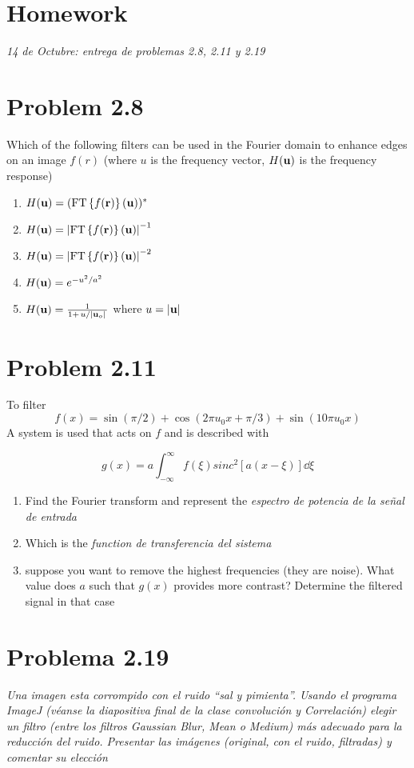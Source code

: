 \documentclass[../main/main.tex]{subfiles}
\begin{document}
\section{Homework}

\emph{14 de Octubre: entrega de problemas 2.8, 2.11 y 2.19}

\section*{Problem 2.8}


Which of the following filters can be used in the Fourier domain to enhance edges on an image $f(r)$ (where $u$ is the frequency vector, $H(\vb{u})$ is the frequency response)

\begin{enumerate}
	\item $H(\vb{u}) = (\textrm{FT}\left\{f(\vb{r})\right\}(\vb{u}))^{*}$
	\item $H(\vb{u}) = \abs{\textrm{FT}\left\{f(\vb{r})\right\}(\vb{u})}^{-1}$
	\item $H(\vb{u}) = \abs{\textrm{FT}\left\{f(\vb{r})\right\}(\vb{u})}^{-2}$
	\item $H(\vb{u}) = e^{-u^{2}/a^{2}}$
	\item $H(\u) = \frac{1}{1+\flatfrac {u}{|\u_{o}|}}$ where $u = \abs{\vb{u}}$
\end{enumerate}

\section*{Problem 2.11}

To filter
\begin{equation*}
	f(x) = \sin(\pi/2) + \cos(2\pi u_{0}x + \pi/3) + \sin(10\pi u_{0} x)
\end{equation*}
A system is used that acts on $f$ and is described with

\begin{equation*}
	g(x) = a \int_{-\infty}^{\infty} %
	f(\xi) sinc^{2}\left[a(x - \xi)\right]\dd{\xi}
\end{equation*}

\begin{enumerate}
	\item Find the Fourier transform and represent the \emph{espectro de potencia de la señal de entrada}
	\item Which is the \emph{function de transferencia del sistema}
	\item suppose you want to remove the highest frequencies (they are noise). What value does $a$ such that $g(x)$ provides more contrast? Determine the filtered signal in that case

\end{enumerate}

\section*{Problema 2.19}

\emph{Una imagen esta corrompido con el ruido ``sal y pimienta''. Usando el programa ImageJ (véanse la diapositiva final de la clase convolución y Correlación) elegir un filtro (entre los filtros Gaussian Blur, Mean o Medium) más adecuado para la reducción del ruido. Presentar las imágenes (original, con el ruido, filtradas) y comentar su elección}
\end{document}
